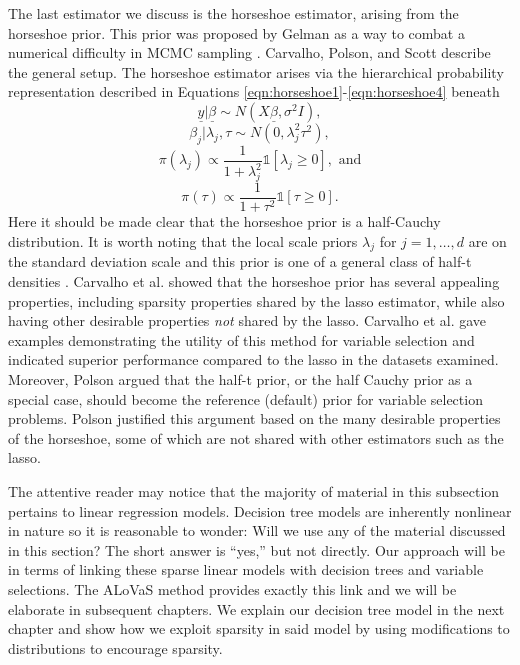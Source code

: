  The last estimator we discuss is the horseshoe estimator, arising from the horseshoe prior. This prior was proposed by Gelman as a way to combat a numerical difficulty in MCMC sampling \cite{gelman2006prior}. Carvalho, Polson, and Scott \cite{carvalho2010horseshoe,carvalhohandling} describe the general setup. The horseshoe estimator arises via the hierarchical probability representation described in Equations \ref{eqn:horseshoe1}-\ref{eqn:horseshoe4} beneath 
 \begin{equation}\label{eqn:horseshoe1}
 \underline{y}\vert\underline{\beta} \sim N(X\underline{\beta}, \sigma^2I),
 \end{equation}  
 \begin{equation}\label{eqn:horseshoe2}
 \beta_j\vert\lambda_j,\tau \sim N(0, \lambda_j^2\tau^2),
 \end{equation}  
  \begin{equation}\label{eqn:horseshoe3}
  \pi(\lambda_j)\propto \frac{1}{1+\lambda_j^2}\mathds{1}[\lambda_j\geq0], \text{ and}
 \end{equation} 
   \begin{equation}\label{eqn:horseshoe4}
  \pi(\tau)\propto \frac{1}{1+\tau^2}\mathds{1}[\tau\geq0].
 \end{equation}     
Here it should be made clear that the horseshoe prior is a half-Cauchy distribution. It is worth noting that the local scale priors $\lambda_j$ for $j=1, \dots, d$ are on the standard deviation scale and this prior is one of a general class of half-t densities \cite{gelman2006prior,polson2011half}. Carvalho et al. \cite{carvalhohandling} showed that the horseshoe prior has several appealing properties, including sparsity properties shared by the lasso estimator, while also having other desirable properties \emph{not} shared by the lasso. Carvalho et al. \cite{carvalho2010horseshoe,carvalhohandling} gave examples demonstrating the utility of this method for variable selection and indicated superior performance compared to the lasso in the datasets examined. Moreover, Polson \cite{polson2011half} argued that the half-t prior, or the half Cauchy prior as a special case, should become the reference (default) prior for variable selection problems. Polson justified this argument based on the many desirable properties of the horseshoe, some of which are not shared with other estimators such as the lasso. 
 
  The attentive reader may notice that the majority of material in this subsection pertains to linear regression models. Decision tree models are inherently nonlinear in nature so it is reasonable to wonder: Will we use any of the material discussed in this section? The short answer is ``yes,'' but not directly. Our approach will be in terms of linking these sparse linear models with decision trees and variable selections. The ALoVaS method provides exactly this link and we will be elaborate in subsequent chapters. We explain our decision tree model in the next chapter and show how we exploit sparsity in said model by using modifications to distributions to encourage sparsity. 
  
